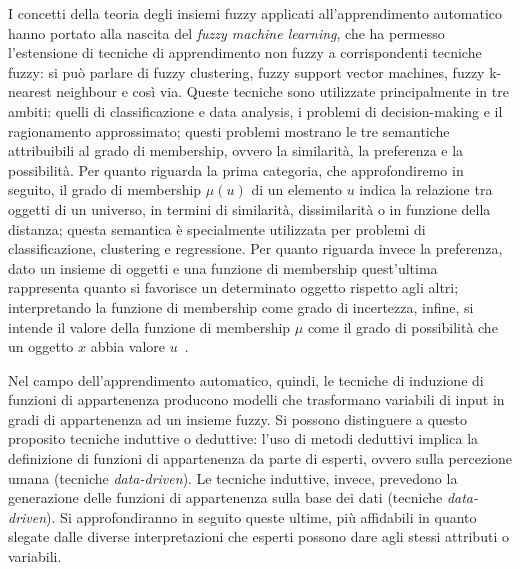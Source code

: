 \documentclass[oneside, openany]{book}
\begin{document}
		I concetti della teoria degli insiemi fuzzy applicati all'apprendimento automatico hanno portato alla nascita del \textit{fuzzy machine learning}, che ha permesso l'estensione di tecniche di apprendimento non fuzzy a corrispondenti tecniche fuzzy: si può parlare di fuzzy clustering, fuzzy support vector machines, fuzzy k-nearest neighbour e così via. Queste tecniche sono utilizzate principalmente in tre ambiti: quelli di classificazione e data analysis, i problemi di decision-making e il ragionamento approssimato; questi problemi mostrano le tre semantiche attribuibili al grado di membership, ovvero la similarità, la preferenza e la possibilità.\newline
		Per quanto riguarda la prima categoria, che approfondiremo in seguito, il grado di membership $\mu(u)$ di un elemento $u$  indica la relazione tra oggetti di un universo, in termini di similarità, dissimilarità o in funzione della distanza; questa semantica è specialmente utilizzata per problemi di classificazione, clustering e regressione. Per quanto riguarda invece la preferenza, dato un insieme di oggetti e una funzione di membership quest'ultima rappresenta quanto si favorisce un determinato oggetto rispetto agli altri; interpretando la funzione di membership come grado di incertezza, infine, si intende il valore della funzione di membership $\mu$ come il grado di possibilità che un oggetto $x$ abbia valore $u$~\cite{bib:dubois}.
		
		Nel campo dell'apprendimento automatico, quindi, le tecniche di induzione di funzioni di appartenenza producono modelli che trasformano variabili di input in gradi di appartenenza ad un insieme fuzzy. Si possono distinguere a questo proposito tecniche induttive o deduttive: l'uso di metodi deduttivi implica la definizione di funzioni di appartenenza da parte di esperti, ovvero sulla percezione umana (tecniche \textit{data-driven}). Le tecniche induttive, invece, prevedono la generazione delle funzioni di appartenenza sulla base dei dati (tecniche \textit{data-driven}). Si approfondiranno in seguito queste ultime, più affidabili in quanto slegate dalle diverse interpretazioni che esperti possono dare agli stessi attributi o variabili.
	
\end{document}
